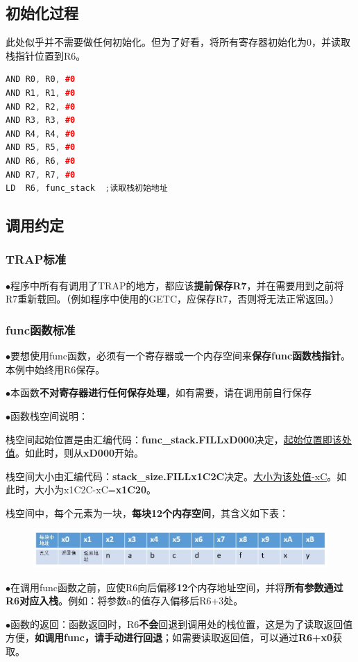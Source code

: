 \documentclass[UTF8]{article}
\newcommand{\jumpline} {\hspace*{\fill} \par}
\newcommand{\keypoint}[1]{$\bullet$\quad#1\par}
\begin{document}
\subsection{初始化过程}
此处似乎并不需要做任何初始化。但为了好看，将所有寄存器初始化为0，并读取栈指针位置到R6。\par
\begin{lstlisting}[language=C++]
AND	R0, R0, #0
AND	R1, R1, #0
AND	R2, R2, #0
AND	R3, R3, #0
AND	R4, R4, #0
AND	R5, R5, #0
AND	R6, R6, #0
AND	R7, R7, #0
LD	R6, func_stack	;读取栈初始地址
\end{lstlisting}
\subsection{调用约定}
\subsubsection{TRAP标准}
\keypoint{程序中所有有调用了TRAP的地方，都应该\textbf{提前保存R7}，并在需要用到之前将R7重新载回。（例如程序中使用的GETC，应保存R7，否则将无法正常返回。）}
\subsubsection{func函数标准}
\keypoint{要想使用func函数，必须有一个寄存器或一个内存空间来\textbf{保存func函数栈指针}。本例中始终用R6保存。}
\keypoint{本函数\textbf{不对寄存器进行任何保存处理}，如有需要，请在调用前自行保存}
\keypoint{函数栈空间说明：\par
	栈空间起始位置是由汇编代码：\textbf{func\_stack\quad.FILL\quad xD000}决定，\underline{起始位置即该处值}。如此时，则从\textbf{xD000}开始。\par
	栈空间大小由汇编代码：\textbf{stack\_size\quad.FILL\quad x1C2C}决定。\underline{大小为该处值-xC}。如此时，大小为x1C2C-xC=\textbf{x1C20}。\par
	栈空间中，每个元素为一块，\textbf{每块12个内存空间}，其含义如下表：\par
	\begin{figure}[H]
		\centering
		\includegraphics[scale=0.5]{stack.jpg}
		\label{stack}
	\end{figure}\par
}
\jumpline
\keypoint{在调用func函数之前，应使R6向后偏移\textbf{12}个内存地址空间，并将\textbf{所有参数通过R6对应入栈}。例如：将参数a的值存入偏移后R6+3处。}
\keypoint{函数的返回：函数返回时，R6\textbf{不会}回退到调用处的栈位置，这是为了读取返回值方便，\textbf{如调用func，请手动进行回退}；如需要读取返回值，可以通过\textbf{R6+x0}获取。}
\end{document}
